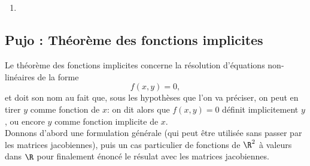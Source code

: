 \documentclass[12pt, class=report,crop=false]{standalone}
\begin{document}
{{%
\subsection{}


\subsection{}


\subsection{}


\subsection{}
 
 
\begin{miniexercices}
\sauteligne
\begin{enumerate}
  \item 
\end{enumerate}
\end{miniexercices}



\subsection{Pujo : Th\'eor\`eme des fonctions implicites}

\noindent Le th\'eor\`eme des fonctions implicites concerne la r\'esolution d'\'equations non-lin\'eaires de la forme
\begin{equation*}
  f(x,y)=0,
\end{equation*}
et doit son nom au fait que, sous les hypoth\`eses que l'on va pr\'eciser, on peut en tirer $y$ comme
fonction de $x$: on dit alors que $f(x,y)=0$ d\'efinit implicitement $y$, ou encore $y$ comme
fonction implicite de $x$.\\
Donnons d'abord une formulation générale (qui peut être utilisée sans passer par les matrices jacobiennes),
puis un cas particulier de fonctions de $\R^2$ à valeurs dans $\R$ pour finalement énoncé le résulat avec les matrices jacobiennes.




}}
\end{document}
